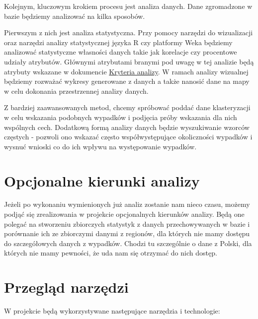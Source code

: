 Kolejnym, kluczowym krokiem procesu jest analiza danych. Dane
zgromadzone w bazie będziemy analizować na kilka sposobów.

Pierwszym z nich jest analiza statystyczna. Przy pomocy narzędzi do
wizualizacji oraz narzędzi analizy statystycznej języka R czy platformy
Weka będziemy analizować statystyczne własności danych takie jak
korelacje czy procentowe udziały atrybutów. Głównymi atrybutami branymi
pod uwagę w tej analizie będą atrybuty wskazane w dokumencie
\href{Kryteria-analizy}{Kryteria analizy}. W ramach analizy wizualnej
będziemy rozważać wykresy generowane z danych a także nanosić dane na
mapy w celu dokonania przestrzennej analizy danych.

Z bardziej zaawansowanych metod, chcemy spróbować poddać dane
klasteryzacji w celu wskazania podobnych wypadków i podjęcia próby
wskazania dla nich wspólnych cech. Dodatkową formą analizy danych będzie
wyszukiwanie wzorców częstych - pozwoli ono wskazać często
współwystępujące okoliczności wypadków i wysnuć wnioski co do ich wpływu
na występowanie wypadków.

\section{Opcjonalne kierunki analizy}\label{opcjonalne-kierunki-analizy}

Jeżeli po wykonaniu wymienionych już analiz zostanie nam nieco czasu,
możemy podjąć się zrealizowania w projekcie opcjonalnych kierunków
analizy. Będą one polegać na stworzeniu zbiorczych statystyk z danych
przechowywanych w bazie i porównanie ich ze zbiorczymi danymi z
regionów, dla których nie mamy dostępu do szczegółowych danych z
wypadków. Chodzi tu szczególnie o dane z Polski, dla których nie mamy
pewności, że uda nam się otrzymać do nich dostęp.

\section{Przegląd narzędzi}\label{uzywane-technologie}

W projekcie będą wykorzystywane następujące narzędzia i technologie:

